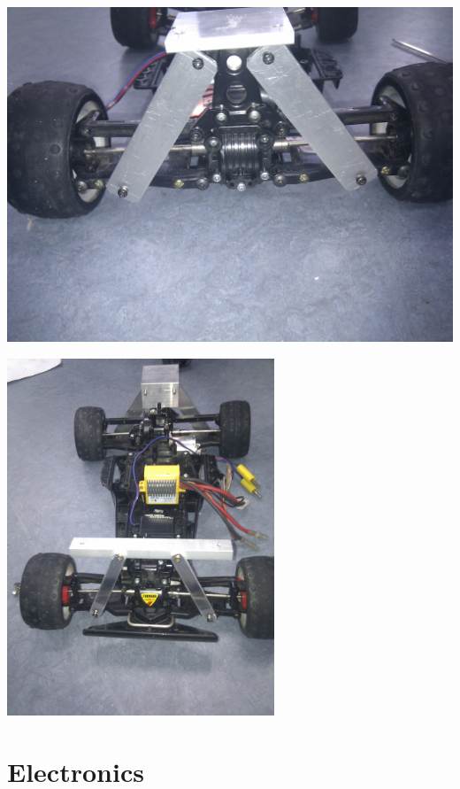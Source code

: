 \documentclass[pdf]{beamer}
\begin{document}
\begin{frame}
  \begin{center}
  \includegraphics[width = \textwidth]{pics/raw/car_back_ueberarbeitet.jpg}
  \end{center}
\end{frame}

\begin{frame}
  \begin{center}
  \includegraphics[width = 0.6\textwidth]{pics/raw/car_enhanced.jpg}
  \end{center}
\end{frame}

\section{Electronics}
\end{document}
